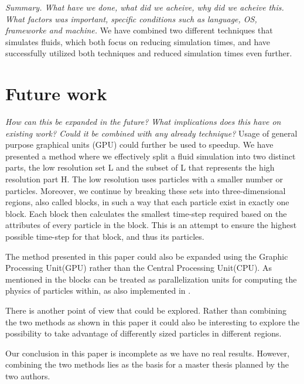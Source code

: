 \documentclass[../main.tex]{subfiles}
\begin{document}
\textit{Summary. What have we done, what did we acheive, why did we acheive this. What factors was important, specific conditions such as language, OS, frameworke and machine.}
We have combined two different techniques that simulates fluids, which both focus on reducing simulation times, and have successfully utilized both techniques and reduced simulation times even further.


\section{Future work}
\textit{How can this be expanded in the future? What implications does this have on existing work? Could it be combined with any already technique?}
Usage of general purpose graphical units (GPU) could further be used to speedup. 
We have presented a method where we effectively split a fluid simulation into two distinct parts, the low resolution set L and the subset of L that represents the high resolution part H. The low resolution uses particles with a smaller number or particles.
Moreover, we continue by breaking these sets into three-dimensional regions, also called blocks, in such a way that each particle exist in exactly one block. Each block then calculates the smallest time-step required based on the attributes of every particle in the block. This is an attempt to ensure the highest possible time-step for that block, and thus its particles. 

The method presented in this paper could also be expanded using the Graphic Processing Unit(GPU) rather than the Central Processing Unit(CPU). As mentioned in \cite{goswami2014regional} the blocks can be treated as parallelization units for computing the physics of particles within, as also implemented in \cite{goswami2010interactive}.

There is another point of view that could be explored. Rather than combining the two methods as shown in this paper it could also be interesting to explore the possibility to take advantage of differently sized particles in different regions.

Our conclusion in this paper is incomplete as we have no real results. However, combining the two methods lies as the basis for a master thesis planned by the two authors.
\end{document}
